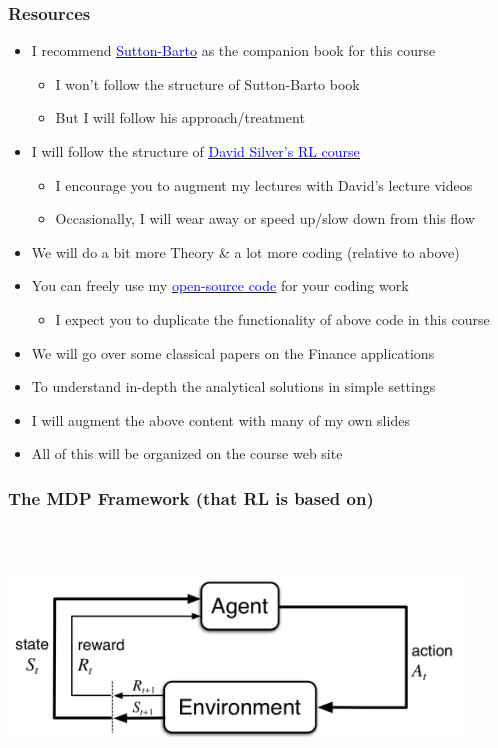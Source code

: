 \documentclass{beamer}
\begin{document}
\begin{frame}
\frametitle{Resources}
\begin{itemize}
\item I recommend \href{http://incompleteideas.net/book/the-book-2nd.html}{\underline{\textcolor{blue}{Sutton-Barto}}} as the companion book for this course
\begin{itemize}
\item I won't follow the structure of Sutton-Barto book
\item But I will follow his approach/treatment
\end{itemize}
\item I will follow the structure of \href{http://www0.cs.ucl.ac.uk/staff/d.silver/web/Teaching.html}{\underline{\textcolor{blue}{David Silver's RL course}}}
\begin{itemize}
\item I encourage you to augment my lectures with David's lecture videos
\item Occasionally, I will wear away or speed up/slow down from this flow
\end{itemize}
\item We will do a bit more Theory \& a lot more coding (relative to above)
\item You can freely use my \href{https://github.com/coverdrive/MDP-DP-RL}{\underline{\textcolor{blue}{open-source code}}} for your coding work
\begin{itemize}
\item I expect you to duplicate the functionality of above code in this course
\end{itemize}
\item We will go over some classical papers on the Finance applications
\item To understand in-depth the analytical solutions in simple settings
\item I will augment the above content with many of my own slides
\item All of this will be organized on the course web site
\end{itemize}
\end{frame}


\begin{frame}
\frametitle{The MDP Framework (that RL is based on)}
\includegraphics[width=12cm, height=7cm]{MDP.png}
\end{frame}
\end{document}
